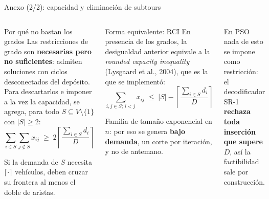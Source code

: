 \documentclass[aspectratio=169, 11pt, xcolor={dvipsnames,table}]{beamer}
\newcommand{\azul}[1]{\textcolor{UsachAzul}{#1}}
\newcommand{\naranja}[1]{\textcolor{UsachNaranja}{#1}}
\newcommand{\gris}[1]{\textcolor{UsachGris}{#1}}
\begin{document}
\begin{frame}[noframenumbering]{Anexo (2/2): capacidad y eliminación de subtours}
\footnotesize
\begin{columns}[T]
\begin{alertblock}{Por qué no bastan los grados}
Las restricciones de grado son \textbf{necesarias pero no suficientes}: admiten soluciones
con ciclos desconectados del depósito. Para descartarlos e imponer a la vez la capacidad,
se agrega, para todo $S \subseteq V\setminus\{1\}$ con $|S| \ge 2$:
\vspace{-4pt}
\[ \sum_{i \in S}\sum_{j \notin S} x_{ij} \;\ge\; 2\left\lceil \frac{\sum_{i\in S} d_i}{D} \right\rceil \]
\vspace{-8pt}

\gris{Si la demanda de $S$ necesita $\lceil \cdot \rceil$ vehículos, deben cruzar su
frontera al menos el doble de aristas.}
\end{alertblock}
\begin{alertblock}{Forma equivalente: RCI}
En presencia de los grados, la desigualdad anterior equivale a la \textit{rounded capacity
inequality} (Lysgaard et al., 2004), que es la que se implementó:
\vspace{-4pt}
\[ \sum_{i,j \in S;\, i<j} x_{ij} \;\le\; |S| - \left\lceil \frac{\sum_{i\in S} d_i}{D} \right\rceil \]
\vspace{-8pt}

\gris{Familia de tamaño \naranja{exponencial} en $n$: por eso se genera \textbf{bajo
demanda}, un corte por iteración, y no de antemano.}
\end{alertblock}
\begin{ideaclave}
\scriptsize
En PSO nada de esto se impone como restricción: el decodificador SR-1
\textbf{rechaza toda inserción que supere $D$}, así la \azul{factibilidad sale por
construcción}.
\end{ideaclave}
\end{columns}
\end{frame}
\end{document}
